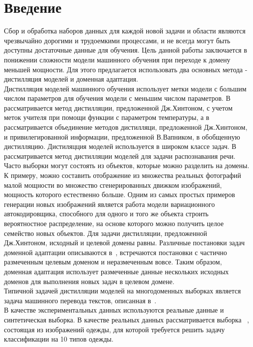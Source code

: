 \newpage


\section{Введение}
Сбор и обработка наборов данных для каждой новой задачи и области являются чрезвычайно дорогими и трудоемкими процессами, и не всегда могут быть доступны достаточные данные для обучения. Цель данной работы заключается в понижении сложности модели машинного обучения при переходе к домену меньшей мощности. Для этого предлагается использовать два основных метода - дистилляция моделей и доменная адаптация.\\
Дистилляция моделей машинного обучения использует метки модели с большим числом параметров для обучения модели с меньшим числом параметров. В~\cite{Hinton2015} рассматривается метод дистилляции, предложенной Дж.Хинтоном, с учетом меток учителя при помощи функции  с параметром температуры, а в~\cite{Vapnik2016} рассматривается объединение методов дистилляци, предложенной Дж.Хинтоном, и привилегированной информации, предложенной В.Вапником, в обобщенную дистилляцию. Дистиляцция моделей используется в широком классе задач. В~\cite{MDASR} рассматривается метод дистилляции моделей для задачи распознавания речи.\\
Часто выборки могут состоять из объектов, которые можно разделить на домены. К примеру, можно составить отображение из множества реальных фотографий малой мощности во множество сгенерированных движком изображений, мощность которого естественно больше. Одним из самых простых примеров генерации новых изображений является работа модели вариационного автокодировщика, способного для одного и того же объекта строить вероятностное распределение, на основе которого можно получить целое семейство новых объектов. Для задачи дистилляции, предложенной Дж.Хинтоном, исходный и целевой домены равны. Различные постановки задач доменной адаптации описываются в~\cite{DeepvisDA}, встречаются постановки с частично размеченным целевым доменом и неразмеченным вовсе. Таким образом, доменная адаптация использует размеченные данные нескольких исходных доменов для выполнения новых задач в целевом домене.\\
Типичной задачей дистилляции моделей на многодоменных выборках является задача машинного перевода текстов, описанная в~\cite{KimRush2016}.\\
В качестве экспериментальных данных используются реальные данные и синтетическая выборка. В качестве реальных данных рассматривается выборка ~\cite{FMNIST}, состоящая из изображений одежды, для которой требуется решить задачу классификации на 10 типов одежды.\\


